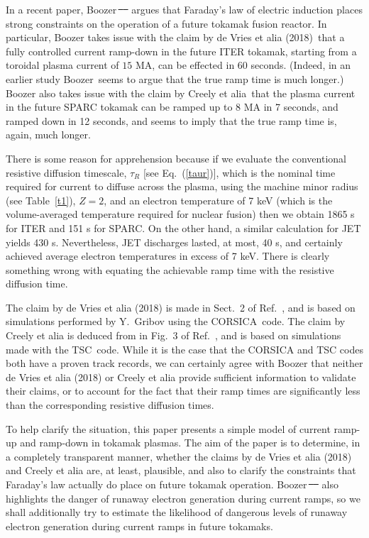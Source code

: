 \documentclass{iopjournal}
\providecommand{\DIFadd}[1]{{\protect\color{blue}\uwave{#1}}} %
\providecommand{\DIFdel}[1]{{\protect\color{red}\sout{#1}}}                      %
\providecommand{\DIFaddbegin}{} %
\providecommand{\DIFaddend}{} %
\providecommand{\DIFdelbegin}{} %
\providecommand{\DIFdelend}{} %
\newcommand{\DIFscaledelfig}{0.5}
\newlength{\DIFdelgraphicswidth} %
\newlength{\DIFdelgraphicsheight} %
\newcommand{\DIFaddincludegraphics}[2][]{{\color{blue}\fbox{\DIFOincludegraphics[#1]{#2}}}} %
\newcommand{\DIFdelincludegraphics}[2][]{%
\sbox{\DIFdelgraphicsbox}{\DIFOincludegraphics[#1]{#2}}%
\settoboxwidth{\DIFdelgraphicswidth}{\DIFdelgraphicsbox} %
\settoboxtotalheight{\DIFdelgraphicsheight}{\DIFdelgraphicsbox} %
\scalebox{\DIFscaledelfig}{%
\parbox[b]{\DIFdelgraphicswidth}{\usebox{\DIFdelgraphicsbox}\\[-\baselineskip] \rule{\DIFdelgraphicswidth}{0em}}\llap{\resizebox{\DIFdelgraphicswidth}{\DIFdelgraphicsheight}{%
\setlength{\unitlength}{\DIFdelgraphicswidth}%
\begin{picture}(1,1)%
\thicklines\linethickness{2pt} %
{\color[rgb]{1,0,0}\put(0,0){\framebox(1,1){}}}%
{\color[rgb]{1,0,0}\put(0,0){\line( 1,1){1}}}%
{\color[rgb]{1,0,0}\put(0,1){\line(1,-1){1}}}%
\end{picture}%
}\hspace*{3pt}}} %
} %
\DeclareRobustCommand{\DIFaddbegin}{\DIFOaddbegin \let\includegraphics\DIFaddincludegraphics} %
\DeclareRobustCommand{\DIFaddend}{\DIFOaddend \let\includegraphics\DIFOincludegraphics} %
\DeclareRobustCommand{\DIFdelbegin}{\DIFOdelbegin \let\includegraphics\DIFdelincludegraphics} %
\DeclareRobustCommand{\DIFdelend}{\DIFOaddend \let\includegraphics\DIFOincludegraphics} %
\begin{document}
In a recent paper, Boozer\,\DIFdelbegin \DIFdel{\mbox{%
\cite{boozer} }\hskip0pt%
}\DIFdelend \DIFaddbegin \DIFadd{\mbox{%
\cite{boozer,boozera} }\hskip0pt%
}\DIFaddend argues  that Faraday's law of electric induction places strong constraints on the operation of a future  tokamak fusion reactor. 
In particular, Boozer takes issue with the claim by de Vries et alia (2018)\,\cite{deVries} that a fully controlled current ramp-down in the future ITER tokamak, starting from a toroidal plasma current of $15$ MA,
can be effected in 60 seconds. (Indeed, in an earlier study Boozer\,\cite{boozer1} seems to argue that the true ramp time is much longer.)  Boozer also takes issue with the claim by Creely et alia\,\cite{creely} that the plasma current in the future SPARC tokamak can be ramped up to 8 MA in
7 seconds, and ramped down in 12 seconds, and seems to imply that the true ramp time is, again, much longer. 

There is some reason for apprehension because if we evaluate the conventional resistive diffusion timescale, $\tau_R$ [see Eq.~(\ref{taur})], which is the nominal
time required  for current to diffuse across the plasma, using the machine minor radius (see Table~\ref{t1}), $Z=2$, and
an electron temperature of 7 keV (which is the volume-averaged temperature required for nuclear fusion) then we obtain 1865 s for ITER and 151 s for SPARC. On the other hand, a similar
calculation for JET yields 430 s. Nevertheless, JET discharges lasted, at most, 40 s, and certainly achieved average electron temperatures in excess of 7 keV. There is clearly something wrong with equating the achievable ramp time with the resistive diffusion time. 

The claim by de Vries et alia (2018) is
made in Sect.~2 of Ref.~\cite{deVries}, and is based on simulations performed by Y.~Gribov using  the CORSICA\,\cite{corsica,corsica1}  code. The claim by Creely et alia is deduced from 
in Fig.~3 of Ref.~\cite{creely}, and is based on simulations made with the TSC\,\cite{tsc}   code. While it is the case that the  CORSICA and TSC codes both have a proven 
track records, we can certainly agree with Boozer that neither de Vries et alia (2018) or Creely et alia provide sufficient information to validate their claims, or to account for the
fact that their ramp times are significantly less than the  corresponding resistive diffusion times. 

To help clarify the situation, this paper presents a simple model of current ramp-up and ramp-down in tokamak plasmas. 
The aim of the paper is
to determine, in a completely transparent manner, whether the claims by de Vries et alia (2018) and Creely et alia are, at least, plausible, and also to clarify the constraints that Faraday's law
actually do place on future tokamak operation. Boozer\,\DIFdelbegin \DIFdel{\mbox{%
\cite{boozer,boozer1}  }\hskip0pt%
}\DIFdelend \DIFaddbegin \DIFadd{\mbox{%
\cite{boozer,boozera}  }\hskip0pt%
}\DIFaddend also highlights the danger
of runaway electron generation during current ramps, so we shall additionally try to estimate the likelihood of dangerous levels of  runaway electron generation during current ramps
in  future tokamaks.  
\end{document}
